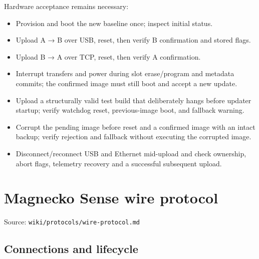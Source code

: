 \documentclass[10pt,a4paper,oneside]{report}
\providecommand{\tightlist}{\setlength{\itemsep}{1pt}\setlength{\parskip}{1pt}}
\begin{document}
Hardware acceptance remains necessary:

\begin{itemize}
\tightlist
\item
  Provision and boot the new baseline once; inspect initial status.
\item
  Upload A → B over USB, reset, then verify B confirmation and stored flags.
\item
  Upload B → A over TCP, reset, then verify A confirmation.
\item
  Interrupt transfers and power during slot erase/program and metadata commits; the confirmed image must still boot and accept a new update.
\item
  Upload a structurally valid test build that deliberately hangs before updater startup; verify watchdog reset, previous-image boot, and fallback warning.
\item
  Corrupt the pending image before reset and a confirmed image with an intact backup; verify rejection and fallback without executing the corrupted image.
\item
  Disconnect/reconnect USB and Ethernet mid-upload and check ownership, abort flags, telemetry recovery and a successful subsequent upload.
\end{itemize}

\chapter{Magnecko Sense wire protocol}\label{wiki-protocols-wire-protocol--magnecko-sense-wire-protocol}

{\small\color{MGSMuted}Source: \nolinkurl{wiki/protocols/wire-protocol.md}\par}\medskip

\section{Connections and lifecycle}\label{wiki-protocols-wire-protocol--connections-and-lifecycle}
\end{document}
